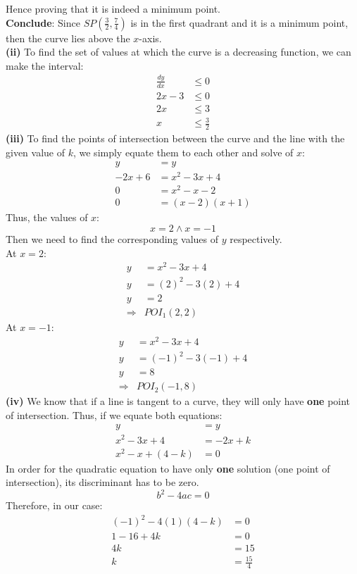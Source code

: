 \documentclass[hidelinks, a4paper, 12pt]{article}
\newcommand{\bd}{\textbf}
\newcommand{\n}{\\[\baselineskip]}
\newcommand{\thus}{\Rightarrow}
\newcommand{\dydx}{\frac{dy}{dx}}
\begin{document}
            Hence proving that it is indeed a minimum point.\n
            \bd{Conclude}: Since $SP \left(\frac{3}{2}, \frac{7}{4}\right)$ is in the first quadrant and it is a minimum point, then the curve lies above the $x$-axis.\n
            \bd{(ii)} To find the set of values at which the curve is a decreasing function, we can make the interval:
            \[\begin{split}
                \dydx &\leq 0\\
                2x-3 &\leq 0\\
                2x &\leq 3\\
                x &\leq \frac{3}{2}
            \end{split}\]
            \bd{(iii)} To find the points of intersection between the curve and the line with the given value of $k$, we simply equate them to each other and solve of $x$:
            \[\begin{split}
                y &= y\\
                -2x + 6 &= x^2-3x+4\\
                0 &= x^2 - x -2\\
                0 &= (x-2)(x+1)
            \end{split}\]
            Thus, the values of $x$:
            \[x = 2 \land x = -1\]
            Then we need to find the corresponding values of $y$ respectively.\n
            At $x=2$:
            \[\begin{split}
                y &= x^2-3x+4\\
                y &= (2)^2-3(2)+4\\
                y &= 2\\
                \thus &POI_1(2,2)
            \end{split}\]
            At $x=-1$:
            \[\begin{split}
                y &= x^2-3x+4\\
                y &= (-1)^2-3(-1)+4\\
                y &= 8\\
                \thus &POI_2(-1,8)
            \end{split}\]
            \bd{(iv)} We know that if a line is tangent to a curve, they will only have \bd{one} point of intersection. Thus, if we equate both equations:
            \[\begin{split}
                y &= y\\
                x^2-3x+4 &= -2x + k\\
                x^2 -x + (4 - k) &= 0
            \end{split}\]
            In order for the quadratic equation to have only \bd{one} solution (one point of intersection), its discriminant has to be zero.
            \[b^2 - 4ac = 0\]
            Therefore, in our case:
            \[\begin{split}
                (-1)^2 - 4 (1) (4-k) &= 0\\
                1 - 16 + 4k &= 0\\
                4k &= 15\\
                k &= \frac{15}{4}
            \end{split}\]
        
\end{document}
